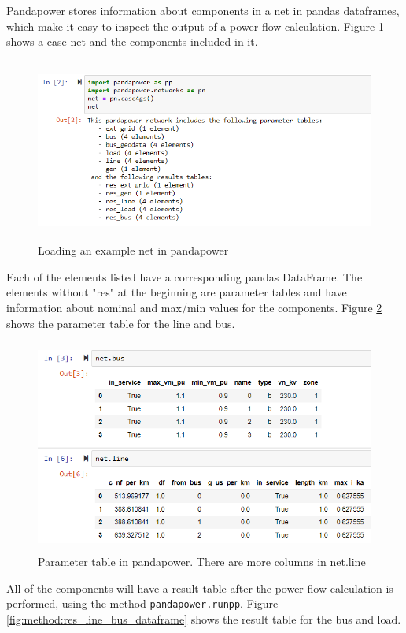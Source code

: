 \documentclass[class=book, crop=false]{standalone}
\begin{document}
Pandapower stores information about components in a net in pandas dataframes, which make it easy to inspect the output of a power flow calculation. Figure \ref{fig:method:loading_example_net} shows a case net and the components included in it. 

\begin{figure}[H]
    \center
    \includegraphics[height=6cm, width=12cm]{figures/case4g_show_net.PNG}
    \caption[size = 9]{Loading an example net in pandapower}
    \label{fig:method:loading_example_net}
\end{figure}
Each of the elements listed have a corresponding pandas DataFrame. The elements without "res" at the beginning are parameter tables and have information about nominal and max/min values for the components. Figure \ref{fig:method:line_bus_dataframe} shows the parameter table for the line and bus.

\begin{figure}[H]
    \includegraphics[height=7cm, width=14cm]{figures/case4g_line_bus.PNG}
    \caption[size = 9]{Parameter table in pandapower. There are more columns in net.line}
    \label{fig:method:line_bus_dataframe}
\end{figure}
All of the components will have a result table after the power flow calculation is performed, using the method \texttt{pandapower.runpp}. Figure \ref{fig:method:res_line_bus_dataframe} shows the result table for the bus and load.
\end{document}

